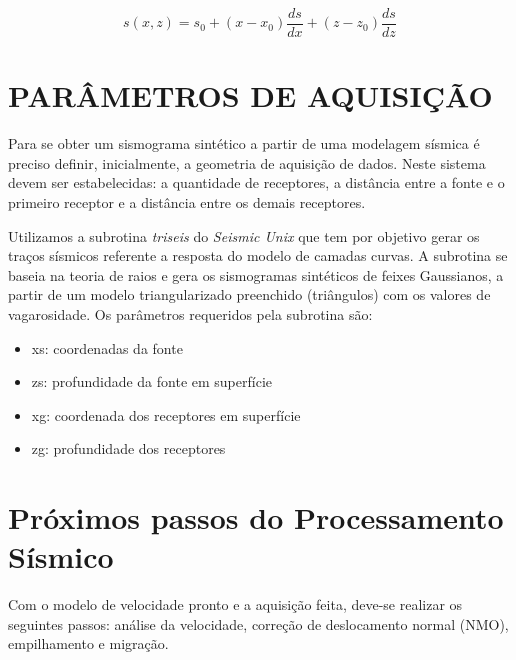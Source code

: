 \begin{equation}
s(x,z)=s_{0}+\left(x-x_{0}\right) \frac{ds}{dx}+\left(z-z_{0}\right) \frac{ds}{dz}
\label{eq:vagarosidade}
\end{equation}


\section{PARÂMETROS DE AQUISIÇÃO}

Para se obter um sismograma sintético a partir de uma modelagem sísmica é preciso definir, inicialmente, a geometria de aquisição de dados. Neste sistema devem ser estabelecidas: a quantidade de receptores, a distância entre a fonte e o primeiro receptor e a distância entre os demais receptores.

Utilizamos a subrotina \textit{triseis} do \textit{Seismic Unix} que tem por objetivo gerar os traços sísmicos referente a resposta do modelo de camadas curvas. A subrotina se baseia na teoria de raios e gera os sismogramas sintéticos de feixes Gaussianos, a partir de um modelo triangularizado preenchido (triângulos) com os valores de vagarosidade. Os parâmetros requeridos pela subrotina são:

\begin{itemize}
	\item xs: coordenadas da fonte
	\item zs: profundidade da fonte em superfície
	\item xg: coordenada dos receptores em superfície
	\item zg: profundidade dos receptores
\end{itemize}

\section{Próximos passos do Processamento Sísmico}

Com o modelo de velocidade pronto e a aquisição feita, deve-se realizar os seguintes passos: análise da velocidade, correção de deslocamento normal (NMO), empilhamento e migração.

